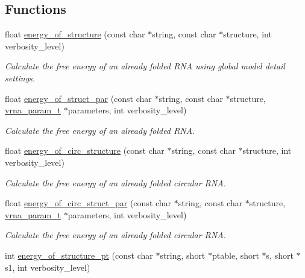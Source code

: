 \subsection*{Functions}
\begin{DoxyCompactItemize}
\item 
float \mbox{\hyperlink{group__eval__deprecated_gaf93986cb3cb29770ec9cca69c9fab8cf}{energy\+\_\+of\+\_\+structure}} (const char $\ast$string, const char $\ast$structure, int verbosity\+\_\+level)
\begin{DoxyCompactList}\small\item\em Calculate the free energy of an already folded R\+NA using global model detail settings. \end{DoxyCompactList}\item 
float \mbox{\hyperlink{group__eval__deprecated_gaf9d064d3c496de42eca6734a96fd2090}{energy\+\_\+of\+\_\+struct\+\_\+par}} (const char $\ast$string, const char $\ast$structure, \mbox{\hyperlink{group__energy__parameters_ga8a69ca7d787e4fd6079914f5343a1f35}{vrna\+\_\+param\+\_\+t}} $\ast$parameters, int verbosity\+\_\+level)
\begin{DoxyCompactList}\small\item\em Calculate the free energy of an already folded R\+NA. \end{DoxyCompactList}\item 
float \mbox{\hyperlink{group__eval__deprecated_gaeb14f3664aec67fc03268ac75253f0f8}{energy\+\_\+of\+\_\+circ\+\_\+structure}} (const char $\ast$string, const char $\ast$structure, int verbosity\+\_\+level)
\begin{DoxyCompactList}\small\item\em Calculate the free energy of an already folded circular R\+NA. \end{DoxyCompactList}\item 
float \mbox{\hyperlink{group__eval__deprecated_ga3f01f9744ba6a40555eb4d81fc77f6df}{energy\+\_\+of\+\_\+circ\+\_\+struct\+\_\+par}} (const char $\ast$string, const char $\ast$structure, \mbox{\hyperlink{group__energy__parameters_ga8a69ca7d787e4fd6079914f5343a1f35}{vrna\+\_\+param\+\_\+t}} $\ast$parameters, int verbosity\+\_\+level)
\begin{DoxyCompactList}\small\item\em Calculate the free energy of an already folded circular R\+NA. \end{DoxyCompactList}\item 
int \mbox{\hyperlink{group__eval__deprecated_ga8831445966b761417e713360791299d8}{energy\+\_\+of\+\_\+structure\+\_\+pt}} (const char $\ast$string, short $\ast$ptable, short $\ast$s, short $\ast$s1, int verbosity\+\_\+level)

\end{DoxyCompactItemize}
